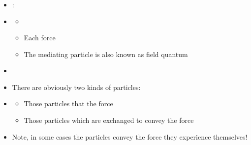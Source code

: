 \xdef\sectiontitle{\IVaSubsectiontitle} 

\begin{frame}
\frametitle{\texorpdfstring{\culine[\sectiontitleulinecolor]{\sectiontitle}}{\sectiontitle} }

\begin{itemize}
	\item {}:
\item[] \begin{itemize}
	 \item {}
\item Each force  
\item The mediating particle is also known as field quantum
\end{itemize}

\item {}

\item There are obviously two kinds of particles:
\item[] \begin{itemize}
	\item Those particles that  the force
\item Those particles which are exchanged to
convey the force

\end{itemize}

\item Note, in some cases the particles convey the force they experience themselves!
\end{itemize}


\endofslide 
\end{frame}


